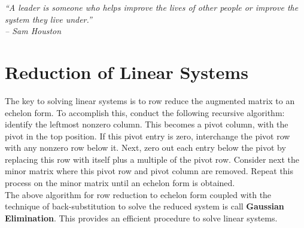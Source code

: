 
\begin{center} 
\emph{``A leader is someone who helps improve the lives of other people or improve the system they live under.''\\ -- Sam Houston}
\end{center}

\section{Reduction of Linear Systems}\label{sec:echelon}
The key to solving linear systems is to row reduce the augmented matrix to an echelon form. To accomplish this, conduct the following recursive algorithm: identify the leftmost nonzero column. This becomes a pivot column, with the pivot in the top position. If this pivot entry is zero, interchange the pivot row with any nonzero row below it. Next, zero out each entry below the pivot by replacing this row with itself plus a multiple of the pivot row. Consider next the minor matrix where this pivot row and pivot column are removed. Repeat this process on the minor matrix until an echelon form is obtained.  \\

The above algorithm for row reduction to echelon form coupled with the technique of back-substitution to solve the reduced system is call \textbf{Gaussian Elimination}. This provides an efficient procedure to solve linear systems.\\

